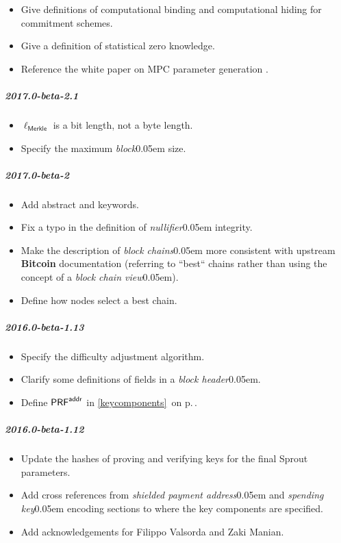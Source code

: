 \documentclass{article}
\renewcommand{\emph}[1]{\hspace{0.15em}{\fontfamily{pnc}\selectfont\scalebox{1.02}[0.999]{\textit{#1}}}\hspace{0.02em}}
\newcommand{\crossref}[1]{\autoref{#1}\, \emph{`\nameref*{#1}\kern -0.05em'} on p.\,\pageref*{#1}}
\newcommand{\introlist}{\needspace{15ex}}
\numberwithin{theorem}{subsection}
\newcommand{\term}[1]{\textsl{#1}\kern 0.05em\xspace}
\newcommand{\termbf}[1]{\textbf{#1}\xspace}
\newcommand{\Bitcoin}{\termbf{Bitcoin}}
\newcommand{\block}{\term{block}}
\newcommand{\blockHeader}{\term{block header}}
\newcommand{\blockchains}{\term{block chains}}
\newcommand{\nullifier}{\term{nullifier}}
\newcommand{\paymentAddress}{\term{shielded payment address}}
\newcommand{\spendingKey}{\term{spending key}}
\newcommand{\PRF}[2]{\mathsf{{PRF}^{#2}_\mathnormal{#1}}}
\newcommand{\PRFaddr}[1]{\PRF{#1}{addr}}
\newcommand{\MerkleHashLength}{\mathsf{\ell_{Merkle}}}
\begin{document}
\begin{itemize}
    \item Give definitions of computational binding and computational hiding
          for commitment schemes.
    \item Give a definition of statistical zero knowledge.
    \item Reference the white paper on MPC parameter generation \cite{BGG2016}.
\end{itemize}

\introlist
\subparagraph{2017.0-beta-2.1}

\begin{itemize}
    \item $\MerkleHashLength$ is a bit length, not a byte length.
    \item Specify the maximum \block size.
\end{itemize}

\introlist
\subparagraph{2017.0-beta-2}

\begin{itemize}
    \item Add abstract and keywords.
    \item Fix a typo in the definition of \nullifier integrity.
    \item Make the description of \blockchains more consistent with
          upstream \Bitcoin documentation (referring to ``best`` chains
          rather than using the concept of a \term{block chain view}).
    \item Define how nodes select a best chain.
\end{itemize}

\introlist
\subparagraph{2016.0-beta-1.13}

\begin{itemize}
    \item Specify the difficulty adjustment algorithm.
    \item Clarify some definitions of fields in a \blockHeader.
    \item Define $\PRFaddr{}$ in \crossref{keycomponents}.
\end{itemize}

\introlist
\subparagraph{2016.0-beta-1.12}

\begin{itemize}
    \item Update the hashes of proving and verifying keys for the final Sprout parameters.
    \item Add cross references from \paymentAddress and \spendingKey encoding
          sections to where the key components are specified.
    \item Add acknowledgements for Filippo Valsorda and Zaki Manian.
\end{itemize}
\end{document}
